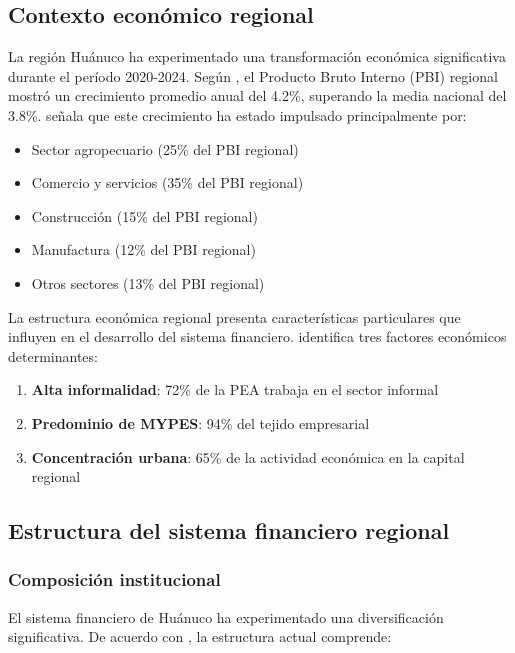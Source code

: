 \documentclass[12pt, a4paper]{article}
\begin{document}
\subsection{Contexto económico regional}

La región Huánuco ha experimentado una transformación económica significativa durante el período 2020-2024. Según \textcite{INEI2024}, el Producto Bruto Interno (PBI) regional mostró un crecimiento promedio anual del 4.2\%, superando la media nacional del 3.8\%. \textcite{Garcia2023} señala que este crecimiento ha estado impulsado principalmente por:

\begin{itemize}
    \item Sector agropecuario (25\% del PBI regional)
    \item Comercio y servicios (35\% del PBI regional)
    \item Construcción (15\% del PBI regional)
    \item Manufactura (12\% del PBI regional)
    \item Otros sectores (13\% del PBI regional)
\end{itemize}

La estructura económica regional presenta características particulares que influyen en el desarrollo del sistema financiero. \textcite{Torres2024} identifica tres factores económicos determinantes:

\begin{enumerate}
    \item \textbf{Alta informalidad}: 72\% de la PEA trabaja en el sector informal
    \item \textbf{Predominio de MYPES}: 94\% del tejido empresarial
    \item \textbf{Concentración urbana}: 65\% de la actividad económica en la capital regional
\end{enumerate}

\subsection{Estructura del sistema financiero regional}

\subsubsection{Composición institucional}

El sistema financiero de Huánuco ha experimentado una diversificación significativa. De acuerdo con \textcite{SBS2024}, la estructura actual comprende:
\end{document}
